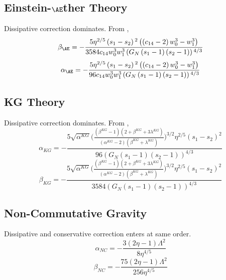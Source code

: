 \documentclass[11pt]{article}
\begin{document}
 
 
 \subsection{Einstein-$\AE$ther Theory}
 Dissipative correction dominates. From \cite{Hansen:2014ewa},
 \begin{equation}
 \beta_{\AE}=-\frac{5 \eta ^{2/5} \left(s_1-s_2\right){}^2 \left(\left(c_{14}-2\right) w_0^3-w_1^3\right)}{3584 c_{14} w_0^3 w_1^3 \left(\text{$G_N$} \left(s_1-1\right) \left(s_2-1\right)\right){}^{4/3}}
 \end{equation}
 \begin{equation}
 \alpha_{\AE}=-\frac{5 \eta ^{2/5} \left(s_1-s_2\right){}^2 \left(\left(c_{14}-2\right) w_0^3-w_1^3\right)}{96 c_{14} w_0^3 w_1^3 \left(\text{$G_N$} \left(s_1-1\right) \left(s_2-1\right)\right){}^{4/3}}
 \end{equation}
 
 \subsection{KG Theory}
 Dissipative correction dominates. From \cite{Hansen:2014ewa},
 \begin{equation}
 \alpha_{KG}=-\frac{5 \sqrt{\alpha^{KG}}\bigg(\frac{(\beta^{KG}-1)(2+\beta^{KG}+3\lambda^{KG})}{(\alpha^{KG}-2)(\beta^{KG}+\lambda^{KG})}\bigg)^{3/2}\eta ^{2/5} (\text{$s_1$}-\text{$s_2$})^2}{96 (\text{$G_N$} (\text{$s_1$}-1) (\text{$s_2$}-1))^{4/3}}
 \end{equation}
 \begin{equation}
 \beta_{KG}=-\frac{5 \sqrt{\alpha^{KG}}\bigg(\frac{(\beta^{KG}-1)(2+\beta^{KG}+3\lambda^{KG})}{(\alpha^{KG}-2)(\beta^{KG}+\lambda^{KG})}\bigg)^{3/2}\eta ^{2/5} (\text{$s_1$}-\text{$s_2$})^2}{3584(\text{$G_N$} (\text{$s_1$}-1) (\text{$s_2$}-1))^{4/3}}
 \end{equation}

 \subsection{Non-Commutative Gravity}
 Dissipative and conservative correction enters at same order. \cite{Kobakhidze:2016cqh}
 \begin{equation}
 \alpha_{NC}=-\frac{3 (2 \eta -1) \Lambda ^2}{8 \eta ^{4/5}}
 \end{equation}
 \begin{equation}
 \beta_{NC}=-\frac{75 (2 \eta -1) \Lambda ^2}{256 \eta ^{4/5}}
 \end{equation}
 \newpage
 
\end{document}
